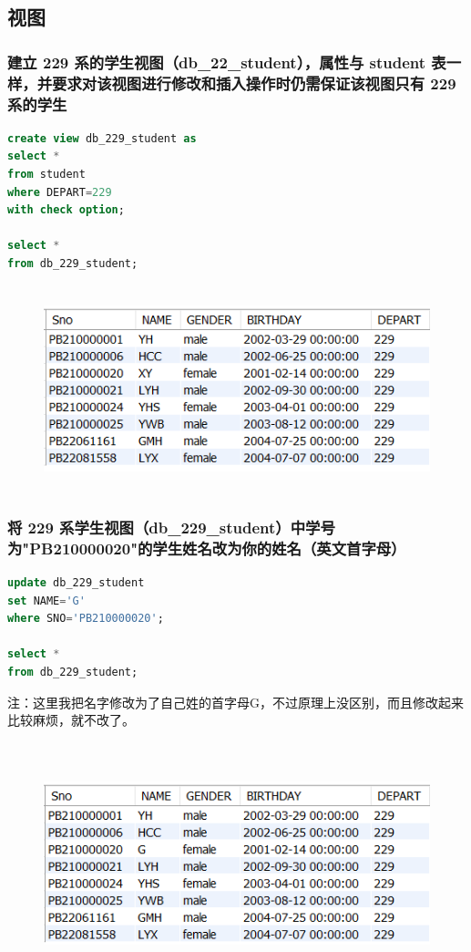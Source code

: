 \documentclass{ctexart}
\begin{document}
\subsection{视图}
\subsubsection{建立 229 系的学生视图（db\_22\_student），属性与 student 表一样，并要求对该视图进行修改和插入操作时仍需保证该视图只有 229 系的学生}
\begin{lstlisting}[language=sql]
create view db_229_student as
select *
from student
where DEPART=229
with check option;

select *
from db_229_student;	
\end{lstlisting}
\begin{figure}[H]
	\centering 
	\includegraphics[height=6cm,width=14cm]{46.png}
	\end{figure}
\subsubsection{将 229 系学生视图（db\_229\_student）中学号为"PB210000020"的学生姓名改为{你的姓名（英文首字母）}}
\begin{lstlisting}[language=sql]
update db_229_student
set NAME='G'
where SNO='PB210000020';

select *
from db_229_student;

\end{lstlisting}
注：这里我把名字修改为了自己姓的首字母G，不过原理上没区别，而且修改起来比较麻烦，就不改了。
\begin{figure}[H]
	\centering 
	\includegraphics[height=7cm,width=14cm]{47.png}
	\end{figure}
\end{document}
